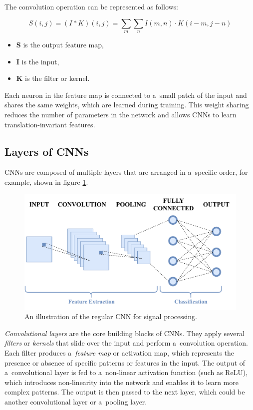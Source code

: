 \newpage

The convolution operation can be represented as follows:

\begin{equation}\label{convolution}
S(i,j) = (I * K)(i,j) = \sum_m \sum_n I(m,n) \cdot K(i-m,j-n)
\end{equation}

\begin{itemize}
\item $\mathbf{S}$ is the output feature map,
\item $\mathbf{I}$ is the input,
\item $\mathbf{K}$ is the filter or kernel.
\end{itemize}

Each neuron in the feature map is connected to a~small patch of the input and shares the same weights, which are learned during training. This weight sharing reduces the number of parameters in the network and allows CNNs to learn translation-invariant features.

\subsection{Layers of CNNs}

CNNs are composed of multiple layers that are arranged in a~specific order, for example, shown in figure \ref{fig:CNN_layers}.

    \begin{figure}[ht!]
        \centering
        \includegraphics[width = \textwidth]{obrazky-figures/CNN_layers.pdf}
        \caption{An illustration of the regular CNN for signal processing.}
        \label{fig:CNN_layers}
    \end{figure}

\textit{Convolutional layers} are the core building blocks of CNNs. They apply several \textit{filters} or \textit{kernels} that slide over the input and perform a~convolution operation. Each filter produces a~\textit{feature map} or activation map, which represents the presence or absence of specific patterns or features in the input.  The output of a~convolutional layer is fed to a~non-linear activation function (such as ReLU), which introduces non-linearity into the network and enables it to learn more complex patterns. The output is then passed to the next layer, which could be another convolutional layer or a~pooling layer. 


